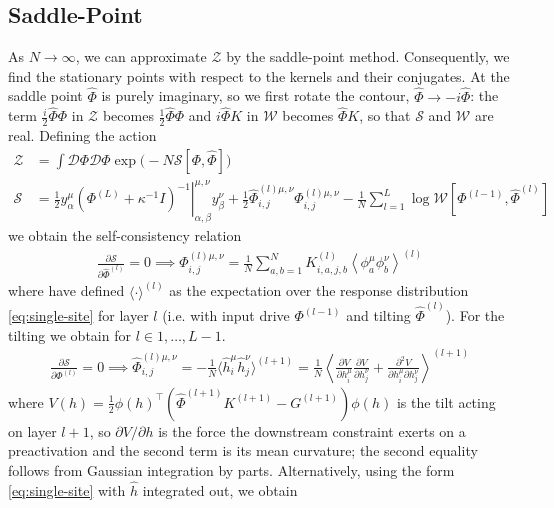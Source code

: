 \documentclass[../main.tex]{subfiles}
\begin{document}
\subsection{Saddle-Point}

As $N \rightarrow \infty$, we can approximate $\mathcal Z$ by the saddle-point method. Consequently, we find the stationary points with respect to the kernels and their conjugates. At the saddle point $\hat \Phi$ is purely imaginary, so we first rotate the contour, $\hat \Phi \rightarrow -i \hat \Phi$: the term $\frac{i}{2} \hat \Phi \Phi$ in $\mathcal Z$ becomes $\frac12 \hat \Phi \Phi$ and $i \hat \Phi K$ in $\mathcal W$ becomes $\hat \Phi K$, so that $\mathcal S$ and $\mathcal W$ are real. Defining the action
\begin{align*}
  \mathcal Z &= \int \mathcal D \Phi \mathcal D \hat \Phi \exp \Big( - N \mathcal S[\Phi, \hat \Phi] \Big) \\
  \mathcal S &= 
    \frac12 y^{\mu}_{\alpha} 
      \left. (\Phi^{(L)} + \kappa^{-1} I )^{-1} \right|^{\mu,\nu}_{\alpha,\beta} y
    ^{\nu}_{\beta}
    + \frac{1}{2} \hat \Phi^{(l)\mu,\nu}_{i,j} \Phi^{(l)\mu,\nu}_{i,j}
    - \frac1N \sum_{l=1}^L \log \mathcal W[\Phi^{(l-1)}, \hat \Phi^{(l)}]
\end{align*}
we obtain the self-consistency relation
\begin{align*}
  \frac{\partial \mathcal S}{\partial \hat \Phi^{(l)}} = 0
  \implies \Phi^{(l)\mu,\nu}_{i,j}
    = \frac1N \sum_{a,b=1}^N K^{(l)}_{i,a,j,b} \left \langle \phi^{\mu}_a \phi^{\nu}_b \right \rangle^{(l)}
\end{align*}
where  have defined $\langle \cdot \rangle^{(l)}$ as the expectation over the  response distribution \eqref{eq:single-site} for layer $l$ (i.e. with input drive $\Phi^{(l-1)}$ and tilting $\hat \Phi^{(l)}$). For the tilting we obtain for $l \in 1, \dots, L-1$.
\begin{align}
  \frac{\partial \mathcal S}{\partial \Phi^{(l)}} = 0
  \implies \hat \Phi^{(l)\mu,\nu}_{i,j} 
  = -\frac1N \langle \hat h^{\mu}_i \hat h^{\nu}_j \rangle^{(l+1)}
  = \frac1N \left \langle
    \frac{\partial V}{\partial h^{\mu}_i}
    \frac{\partial V}{\partial h^{\nu}_j}
    + \frac{\partial^2 V}{\partial h^{\mu}_i \partial h^{\nu}_j}
  \right \rangle^{(l+1)}
  \label{eq:saddle-phi-hat}
\end{align}
where $V(h) = \frac12 \phi(h)^{\top} (\hat \Phi^{(l+1)} K^{(l+1)} - G^{(l+1)}) \phi(h)$ is the tilt acting on layer $l+1$, so $\partial V / \partial h$ is the force the downstream constraint exerts on a preactivation and the second term is its mean curvature; the second equality follows from Gaussian integration by parts. Alternatively, using the form \eqref{eq:single-site} with $\hat h$ integrated out, we obtain
\end{document}
